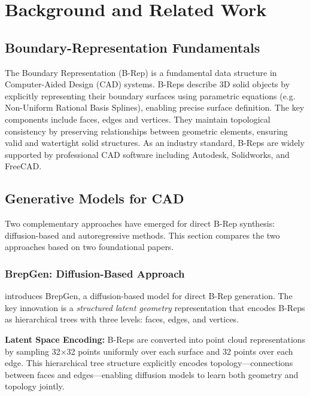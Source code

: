 \section{Background and Related Work}
\label{chap:background}

\subsection{Boundary-Representation Fundamentals}

The Boundary Representation (B-Rep) is a fundamental data structure in Computer-Aided Design (CAD) systems. B-Reps describe 3D solid objects by explicitly representing their boundary surfaces using parametric equations (e.g. Non-Uniform Rational Basis Splines), enabling precise surface definition. The key components include faces, edges and vertices. They maintain topological consistency by preserving relationships between geometric elements, ensuring valid and watertight solid structures. As an industry standard, B-Reps are widely supported by professional CAD software including Autodesk, Solidworks, and FreeCAD.

\subsection{Generative Models for CAD}

Two complementary approaches have emerged for direct B-Rep synthesis: diffusion-based and autoregressive methods. This section compares the two approaches based on two foundational papers.

\subsubsection{BrepGen: Diffusion-Based Approach}

\cite{Xu2024brepgen} introduces BrepGen, a diffusion-based model for direct B-Rep generation. The key innovation is a \textit{structured latent geometry} representation that encodes B-Reps as hierarchical trees with three levels: faces, edges, and vertices.

\textbf{Latent Space Encoding:} B-Reps are converted into point cloud representations by sampling 32×32 points uniformly over each surface and 32 points over each edge. This hierarchical tree structure explicitly encodes topology—connections between faces and edges—enabling diffusion models to learn both geometry and topology jointly.

